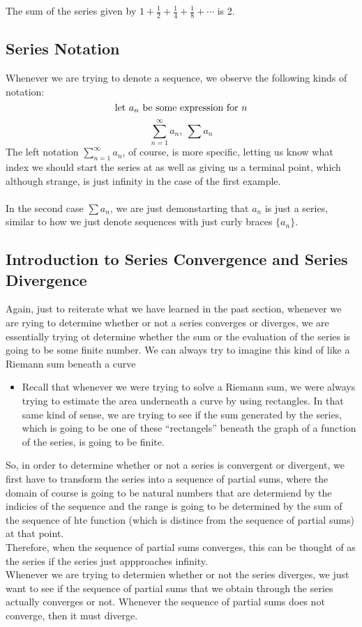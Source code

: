 \documentclass{report}
\begin{document}
\begin{sloppypar}
\begin{center}
{{      The sum of the series given by $ 1 + \frac{1}{2} +
      \frac{1}{4} + \frac{1}{8} + \cdots $ is 2.
    }}
\end{center}

\subsection{Series Notation}
Whenever we are trying to denote a sequence, we observe
the following kinds of notation:
\[ \textrm{let} ~ a_{n} ~\textrm{be some expression for $ n $}\]
\[ \sum_{n=1}^{\infty} a_{n}, ~ \sum a_{n}\]
The left notation $ \sum_{n=1}^{\infty} a_{n}$, of course, is more specific, letting us know what index
we should start the series at as well as giving us a terminal point,
which although strange, is just infinity in the case of the first example.
\\
\\
In the second case $ \sum a_{n}$, we are just demonstarting that $ a_{n}$ is just a series,
similar to how we just denote sequences with just curly braces $ \{ a_{n}\}$.

\subsection{Introduction to Series Convergence and Series Divergence}
Again, just to reiterate what we have learned in the past section, whenever we are rying to determine whether or not a series converges or diverges, we are essentially trying ot determine whether the sum or the evaluation of the series is going to be some finite number. We can always try to imagine this kind of like a Riemann sum beneath a curve
\begin{itemize}
  \item Recall that whenever we were trying to solve a
        Riemann sum, we were always trying to estimate the
        area underneath a curve by using rectangles. In
        that same kind of sense, we are trying to see
        if the sum generated by the series, which is
        going to be one of these ``rectangels'' beneath
        the graph of a function of the series, is going
        to be finite.
\end{itemize}

So, in order to determine whether or not a series is
convergent or divergent, we first have to transform
the series into a sequence of partial sums, where the
domain of course is going to be natural numbers that
are determiend by the indicies of the sequence and the
range is going to be determined by the sum of the
sequence of hte function (which is distince from
the sequence of partial sums) at that point.
\\
Therefore, when the sequence of partial sums converges,
this can be thought of as the series if the series
just appproaches infinity.
\\
Whenever we are trying to determien whether or not the
series diverges, we just want to see if the sequence
of partial sums that we obtain through the series
actually converges or not. Whenever the sequence of
partial sums does not converge, then it must diverge.



\end{sloppypar}
\end{document}
